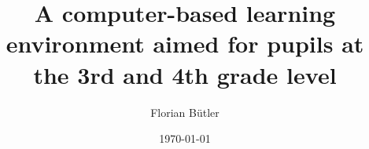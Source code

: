 \documentclass[a4paper, oneside]{thesis}
\title{A computer-based learning environment aimed for pupils at the 3rd and 4th grade level}
\author{Florian Bütler}
\institute{Chair of Information Technology and Education \\[2pt]
ETH Zürich}
\date{\today}
\begin{document}
\frontmatter %
\maketitle

\cleardoublepage

\begin{abstract}
	
\end{abstract}

\begin{acknowledgements}
	
\end{acknowledgements}

\tableofcontents

\mainmatter %














% 
\end{document}
